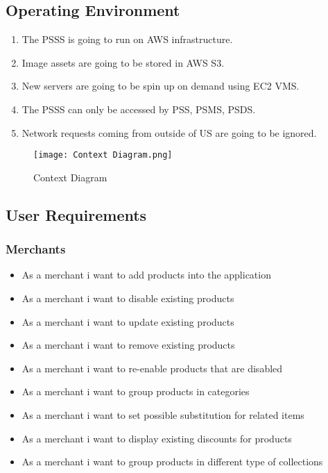 \subsection{Operating Environment}
\begin{enumerate}[label=OE-\arabic*]
    \item The PSSS is going to run on AWS infrastructure.
    \item Image assets are going to be stored in AWS S3.
    \item New servers are going to be spin up on demand using EC2 VMS.
    \item The PSSS can only be accessed by PSS, PSMS, PSDS.
    \item Network requests coming from outside of US are going to be ignored.
\end{enumerate}
\begin{figure}[!htb]
    \centering
    \texttt{[image: Context Diagram.png]}
    \caption{Context Diagram}
\end{figure}
\pagebreak
\subsection{User Requirements}
\subsubsection{Merchants}
\begin{itemize}
    \item As a merchant i want to add products into the application
    \item As a merchant i want to disable existing products
    \item As a merchant i want to update existing products
    \item As a merchant i want to remove existing products
    \item As a merchant i want to re-enable products that are disabled
    \item As a merchant i want to group products in categories
    \item As a merchant i want to set possible substitution for related items
    \item As a merchant i want to display existing discounts for products
    \item As a merchant i want to group products in different type of 
    collections
\end{itemize}
